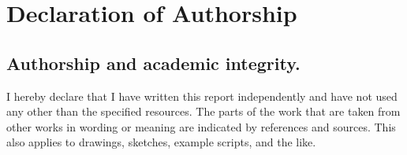 \newpage
\justifying
\section*{Declaration of Authorship}

\subsection*{Authorship and academic integrity.}

I hereby declare that I have written this report independently and have not used any other than the specified resources. The parts of the work that are taken from other works in wording or meaning are indicated by references and sources. This also applies to drawings, sketches, example scripts, and the like.

\begin{figure}[h]
    \hfill\begin{minipage}{4cm}
        \centering
    \end{minipage}\hspace{1cm}
\end{figure}
